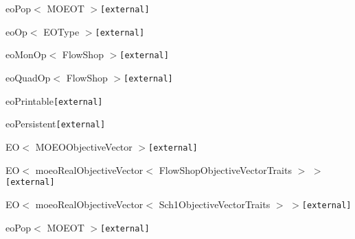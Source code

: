 \begin{CompactList}
\begin{CompactList}
\begin{CompactList}
\begin{CompactList}
\begin{CompactList}
\item {}
\end{CompactList}
\end{CompactList}
\end{CompactList}
\item eo\-Pop$<$ MOEOT $>${\tt  [external]}\begin{CompactList}
\item {}
\end{CompactList}
\end{CompactList}
\item eo\-Op$<$ EOType $>${\tt  [external]}\begin{CompactList}
\item eo\-Mon\-Op$<$ Flow\-Shop $>${\tt  [external]}\item eo\-Quad\-Op$<$ Flow\-Shop $>${\tt  [external]}\end{CompactList}
\item eo\-Printable{\tt  [external]}\begin{CompactList}
\item eo\-Persistent{\tt  [external]}\begin{CompactList}
\item EO$<$ MOEOObjective\-Vector $>${\tt  [external]}\item EO$<$ moeo\-Real\-Objective\-Vector$<$ Flow\-Shop\-Objective\-Vector\-Traits $>$ $>${\tt  [external]}\item EO$<$ moeo\-Real\-Objective\-Vector$<$ Sch1Objective\-Vector\-Traits $>$ $>${\tt  [external]}\item eo\-Pop$<$ MOEOT $>${\tt  [external]}\end{CompactList}
\end{CompactList}
\item {}
\item {}
\begin{CompactList}
\item {}
\item {}

\end{CompactList}
\end{CompactList}
